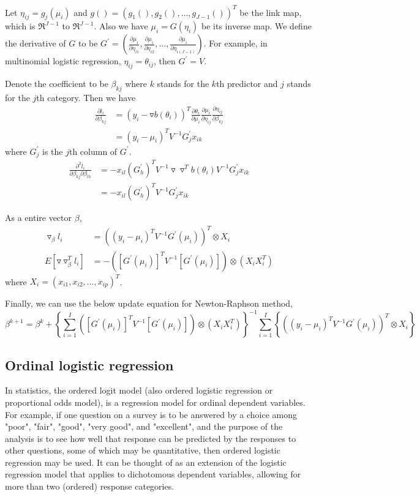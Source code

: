 Let $\eta_{ij} = g_j(\mu_i)$ and $g() = (g_1(), g_2(), ..., g_{J-1}())^T$ be the link map, which is $\Re^{J-1}$ to $\Re^{J-1}$. Also we have $\mu_i = G(\eta_i)$ be its inverse map. We define the derivative of $G$ to be $G^\prime = \left(\frac{\partial\mu_i}{\partial\eta_{i1}}, \frac{\partial\mu_i}{\partial\eta_{i2}}, ..., \frac{\partial\mu_i}{\partial\eta_{i(J-1)}} \right)$. For example, in multinomial logistic regression, $\eta_{ij} = \theta_{ij}$, then $G^\prime = V$.

Denote the coefficient to be $\beta_{kj}$ where $k$ stands for the $k$th predictor and $j$ stands for the $j$th category. Then we have
\begin{align*}
\frac{\partial l_i}{\partial \beta_{kj}} & = (y_i - \triangledown b(\theta_i) )^T \frac{\partial \theta_i}{\partial \mu_i} \frac{\partial \mu_i}{\partial \eta_{ij}} \frac{\partial \eta_{ij}}{\partial \beta_{kj}} \\
& = (y_i - \mu_i )^T V^{-1} G^\prime_j x_{ik}
\end{align*}
where $G^\prime_j$ is the $j$th column of $G^\prime$.
\begin{align*}
\frac{\partial^2 l_i}{\partial\beta_{kj} \partial\beta_{lh}} &= -x_{il} (G^\prime_h)^T V^{-1} \triangledown \triangledown^T b(\theta_i) V^{-1} G^\prime_j x_{ik} \\
& = -x_{il} (G^\prime_h)^T V^{-1} G^\prime_j x_{ik}
\end{align*}

As a entire vector $\beta$,
\begin{align*}
\triangledown_\beta l_i &= \left((y_i - \mu_i)^T V^{-1} G^\prime(\mu_i) \right)^T \otimes X_i \\
E\left[\triangledown \triangledown^T_\beta l_i\right] & = - \left( [G^\prime(\mu_i)]^T V^{-1} [G^\prime(\mu_i)] \right) \otimes (X_i X_i^T)
\end{align*}
where $X_i = (x_{i1}, x_{i2}, ... , x_{ip})^T$.

Finally, we can use the below update equation for Newton-Raphson method,
\[
\beta^{k+1} = \beta^k + \left\{ \sum_{i=1}^I\left([G^\prime(\mu_i)]^T V^{-1} [G^\prime(\mu_i)] \right) \otimes (X_i X_i^T)\right\}^{-1}\sum_{i=1}^I\left\{\left((y_i - \mu_i)^T V^{-1} G^\prime(\mu_i) \right)^T \otimes X_i\right\}
\]

\subsection{Ordinal logistic regression}
In statistics, the ordered logit model (also ordered logistic regression or proportional odds model), is a regression model for ordinal dependent variables. For example, if one question on a survey is to be answered by a choice among "poor", "fair", "good", "very good", and "excellent", and the purpose of the analysis is to see how well that response can be predicted by the responses to other questions, some of which may be quantitative, then ordered logistic regression may be used. It can be thought of as an extension of the logistic regression model that applies to dichotomous dependent variables, allowing for more than two (ordered) response categories.

